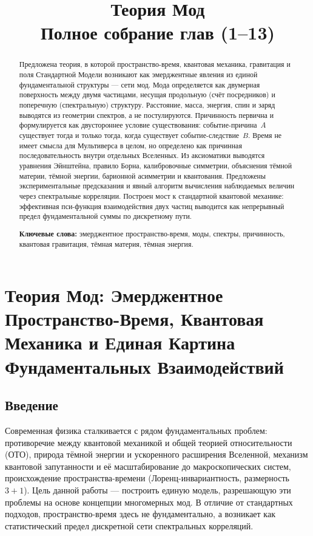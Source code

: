 \documentclass[12pt,a4paper]{article}
\title{\textbf{Теория Мод}\\
\large Полное собрание глав (1--13)}
\author{}
\date{}
\begin{document}
\maketitle
\tableofcontents
\newpage

\section{Теория Мод: Эмерджентное Пространство-Время, Квантовая Механика и Единая Картина Фундаментальных Взаимодействий}

\begin{abstract}
Предложена теория, в которой пространство-время, квантовая механика, гравитация и поля Стандартной Модели возникают как эмерджентные явления из единой фундаментальной структуры --- сети мод. Мода определяется как двумерная поверхность между двумя частицами, несущая продольную (счёт посредников) и поперечную (спектральную) структуру. Расстояние, масса, энергия, спин и заряд выводятся из геометрии спектров, а не постулируются. Причинность первична и формулируется как двустороннее условие существования: событие-причина~$A$ существует тогда и только тогда, когда существует событие-следствие~$B$. Время не имеет смысла для Мультиверса в целом, но определено как причинная последовательность внутри отдельных Вселенных. Из аксиоматики выводятся уравнения Эйнштейна, правило Борна, калибровочные симметрии, объяснения тёмной материи, тёмной энергии, барионной асимметрии и квантования. Предложены экспериментальные предсказания и явный алгоритм вычисления наблюдаемых величин через спектральные корреляции. Построен мост к стандартной квантовой механике: эффективная пси-функция взаимодействия двух частиц выводится как непрерывный предел фундаментальной суммы по дискретному пути.

\bigskip
\noindent\textbf{Ключевые слова:} эмерджентное пространство-время, моды, спектры, причинность, квантовая гравитация, тёмная материя, тёмная энергия.
\end{abstract}

\subsection{Введение}
Современная физика сталкивается с рядом фундаментальных проблем: противоречие между квантовой механикой и общей теорией относительности (ОТО), природа тёмной энергии и ускоренного расширения Вселенной, механизм квантовой запутанности и её масштабирование до макроскопических систем, происхождение пространства-времени (Лоренц-инвариантность, размерность $3+1$). Цель данной работы --- построить единую модель, разрешающую эти проблемы на основе концепции многомерных мод. В отличие от стандартных подходов, пространство-время здесь не фундаментально, а возникает как статистический предел дискретной сети спектральных корреляций.
\end{document}
